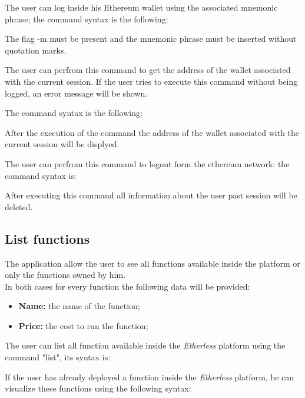 The user can log inside his Ethereum wallet using the associated mnemonic phrase; the command syntax is the following:

\begin{center}
\end{center}
The flag -m must be present and the mnemonic phrase must be inserted without quotation marks.

The user can perfrom this command to get the address of the wallet associated with the current session. If the user tries to execute this command without being logged, an error message will be shown.

The command syntax is the following: \\
\begin{center}
\end{center}
After the execution of the command the address of the wallet associated with the current session will be displyed.

The user can perfrom this command to logout form the ethereum network; the command syntax is:
\begin{center}
\end{center}
After executing this command all information about the user past session will be deleted.

\subsection{List functions}
The application allow the user to see all functions available inside the platform or only the functions owned by him. \\
\noindent In both cases for every function the following data will be provided:
\begin{itemize}
	\item \textbf{Name: } the name of the function;
	\item \textbf{Price: } the cost to run the function;
\end{itemize}

The user can list all function available inside the \textit{Etherless} platform using the command "list", its syntax is:
\begin{center}
\end{center}
If the user has already deployed a function inside the \textit{Etherless} platform, he can visualize these functions using the following syntax:
\begin{center}
\end{center}

